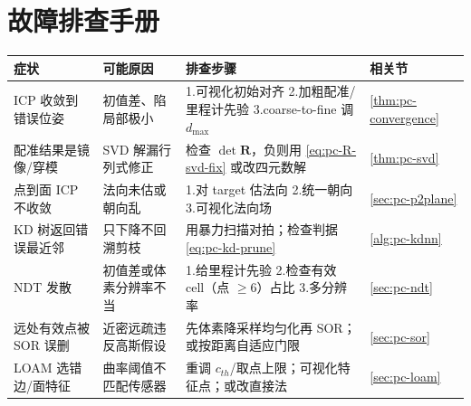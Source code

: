 \section*{故障排查手册}
\begin{table}[H]\centering\small
\begin{tabular}{p{} p{} p{} p{}}
\toprule
症状 & 可能原因 & 排查步骤 & 相关节 \\
\midrule
ICP 收敛到错误位姿 & 初值差、陷局部极小 & 1.可视化初始对齐 2.加粗配准/里程计先验 3.coarse-to-fine 调 $d_{\max}$ & \cref{thm:pc-convergence} \\
配准结果是镜像/穿模 & SVD 解漏行列式修正 & 检查 $\det\mathbf{R}$，负则用 \cref{eq:pc-R-svd-fix} 或改四元数解 & \cref{thm:pc-svd} \\
点到面 ICP 不收敛 & 法向未估或朝向乱 & 1.对 target 估法向 2.统一朝向 3.可视化法向场 & \cref{sec:pc-p2plane} \\
KD 树返回错误最近邻 & 只下降不回溯剪枝 & 用暴力扫描对拍；检查判据 \cref{eq:pc-kd-prune} & \cref{alg:pc-kdnn} \\
NDT 发散 & 初值差或体素分辨率不当 & 1.给里程计先验 2.检查有效 cell（点 $\ge6$）占比 3.多分辨率 & \cref{sec:pc-ndt} \\
远处有效点被 SOR 误删 & 近密远疏违反高斯假设 & 先体素降采样均匀化再 SOR；或按距离自适应门限 & \cref{sec:pc-sor} \\
LOAM 选错边/面特征 & 曲率阈值不匹配传感器 & 重调 $c_{th}$/取点上限；可视化特征点；或改直接法 & \cref{sec:pc-loam} \\
\bottomrule
\end{tabular}
\end{table}

